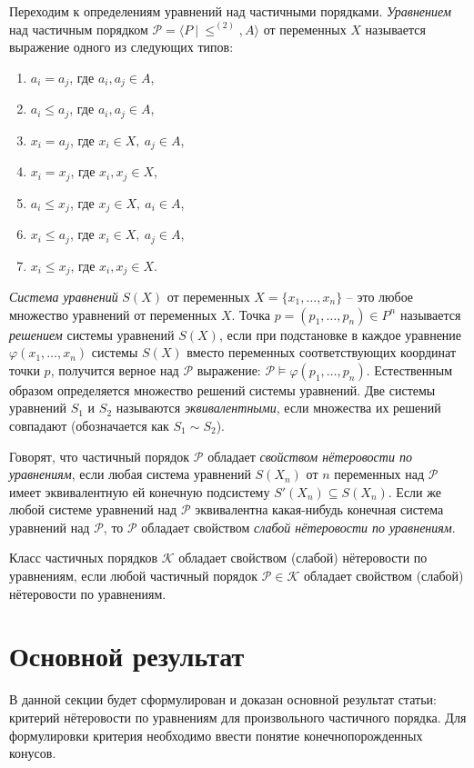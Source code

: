 \documentclass[12pt]{article}
\theoremstyle{break}
\def\P{\mathcal{P}}
\begin{document}
		Переходим к определениям уравнений над частичными порядками. \textit{Уравнением} над частичным порядком $\P = \langle P~|~\leqslant^{(2)}, A\rangle$ от переменных $X$ называется выражение одного из следующих типов:
		\begin{enumerate}
			\item $a_i=a_j$, где $a_i, a_j\in A$,
			\item $a_i\leqslant a_j$, где $a_i, a_j\in A$,
			\item $x_i=a_j$, где $x_i\in X,~a_j\in A$,
			\item $x_i=x_j$, где $x_i, x_j\in X$,
			\item $a_i\leqslant x_j$, где $x_j\in X,~a_i\in A$,
			\item $x_i\leqslant a_j$, где $x_i\in X,~a_j\in A$,
			\item $x_i\leqslant x_j$, где $x_i, x_j\in X$.
		\end{enumerate}

		\textit{Система уравнений} $S(X)$ от переменных $X=\{x_1,\dots,x_n\}$ -- это любое множество уравнений от переменных $X$. Точка $p=(p_1,\dots,p_n)\in P^n$ называется \textit{решением} системы уравнений $S(X)$, если при подстановке в каждое уравнение $\varphi(x_1,\dots,x_n)$ системы $S(X)$ вместо переменных соответствующих координат точки $p$, получится верное над $\P$ выражение: $\P\vDash \varphi(p_1,\dots,p_n)$. Естественным образом определяется множество решений системы уравнений. Две системы уравнений $S_1$ и $S_2$ называются \textit{эквивалентными}, если множества их решений совпадают (обозначается как $S_1\sim S_2$).
		
		
		Говорят, что частичный порядок $\P$ обладает \textit{свойством нётеровости по уравнениям}, если любая система уравнений $S(X_n)$ от $n$ переменных над $\P$ имеет эквивалентную ей конечную подсистему $S'(X_n) \subseteq S(X_n)$. Если же любой системе уравнений над $\P$ эквивалентна какая-нибудь конечная система уравнений над $\P$, то $\P$ обладает свойством \textit{слабой нётеровости по уравнениям}.
		
		Класс частичных порядков $\mathcal{K}$ обладает свойством (слабой) нётеровости по уравнениям, если любой частичный порядок $\P \in \mathcal{K}$ обладает свойством (слабой) нётеровости по уравнениям.
		
	
	\section{Основной результат}
		В данной секции будет сформулирован и доказан основной результат статьи: критерий нётеровости по уравнениям для произвольного частичного порядка. Для формулировки критерия необходимо ввести понятие конечнопорожденных конусов.
\end{document}

